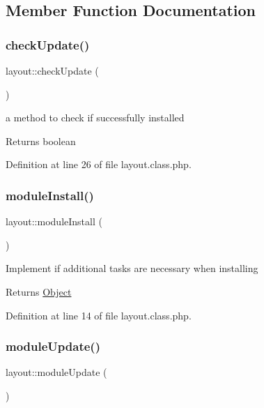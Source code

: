 \subsection{Member Function Documentation}
\mbox{\label{classlayout_a756e56995ca498f4cc63b18c78bf81c5}} 
\subsubsection{\texorpdfstring{check\+Update()}{checkUpdate()}}
{\footnotesize\ttfamily layout\+::check\+Update (\begin{DoxyParamCaption}{ }\end{DoxyParamCaption})}

a method to check if successfully installed \begin{DoxyReturn}{Returns}
boolean 
\end{DoxyReturn}


Definition at line 26 of file layout.\+class.\+php.

\mbox{\label{classlayout_a02df5d38eeced2b8b69d299dbdfab644}} 
\subsubsection{\texorpdfstring{module\+Install()}{moduleInstall()}}
{\footnotesize\ttfamily layout\+::module\+Install (\begin{DoxyParamCaption}{ }\end{DoxyParamCaption})}

Implement if additional tasks are necessary when installing \begin{DoxyReturn}{Returns}
\hyperlink{classObject}{Object} 
\end{DoxyReturn}


Definition at line 14 of file layout.\+class.\+php.

\mbox{\label{classlayout_affc50951ec759146d27e798b7ac779ab}} 
\subsubsection{\texorpdfstring{module\+Update()}{moduleUpdate()}}
{\footnotesize\ttfamily layout\+::module\+Update (\begin{DoxyParamCaption}{ }\end{DoxyParamCaption})}


